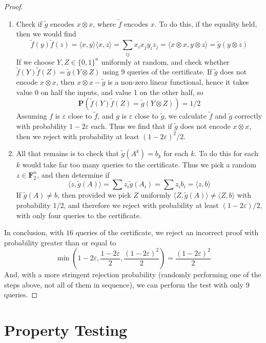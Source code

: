 \begin{proof}
\begin{enumerate}
        \item Check if $\tilde{g}$ encodes $x \otimes x$, where $\tilde{f}$ encodes $x$. To do this, if the equality held, then we would find
        \[ \tilde{f}(y) \tilde{f}(z) = \langle x, y \rangle \langle x, z \rangle = \sum_{ij} x_i x_j y_iz_j = \langle x \otimes x, y \otimes z \rangle = \tilde{g}(y \otimes z) \]
        If we choose $Y,Z \in \{ 0,1 \}^n$ uniformly at random, and check whether $\tilde{f}(Y) \tilde{f}(Z) = \tilde{g}(Y \otimes Z)$ using 9 queries of the certificate. If $\tilde{g}$ does not encode $x \otimes x$, then $x \otimes x - \tilde{g}$ is a non-zero linear functional, hence it takes value 0 on half the inputs, and value 1 on the other half, so
        \[ \mathbf{P}(\tilde{f}(Y) \tilde{f}(Z) = \tilde{g}(Y \otimes Z)) = 1/2 \]
        Assuming $f$ is $\varepsilon$ close to $\tilde{f}$, and $g$ is $\varepsilon$ close to $\tilde{g}$, we calculate $\tilde{f}$ and $\tilde{g}$ correctly with probability $1 - 2\varepsilon$ each. Thus we find that if $\tilde{g}$ does not encode $x \otimes x$, then we reject with probability at least $(1 - 2\varepsilon)^2/2$.

        \item All that remains is to check that $\tilde{g}(A^k) = b_k$ for each $k$. To do this for each $k$ would take far too many queries to the certificate. Thus we pick a random $z \in \mathbf{F}_2^n$, and then determine if
        \[ \langle z, \tilde{g}(A) \rangle = \sum z_i \tilde{g}(A_i) = \sum z_i b_i = \langle z, b \rangle \]
        If $\tilde{g}(A) \neq b$, then provided we pick $Z$ uniformly $\langle Z, \tilde{g}(A) \rangle \neq \langle Z, b \rangle$ with probability $1/2$, and therefore we reject with probability at least $(1 - 2\varepsilon)/2$, with only four queries to the certificate.
    \end{enumerate}
    In conclusion, with $16$ queries of the certificate, we reject an incorrect proof with probability greater than or equal to 
    \[ \min \left( 1 - 2 \varepsilon, \frac{1 - 2 \varepsilon}{2}, \frac{(1 - 2 \varepsilon)^2}{2} \right) = \frac{(1 - 2\varepsilon)^2}{2} \]
    And, with a more stringent rejection probability (randomly performing one of the steps above, not all of them in sequence), we can perform the test with only 9 queries.
\end{proof}

\section{Property Testing}

